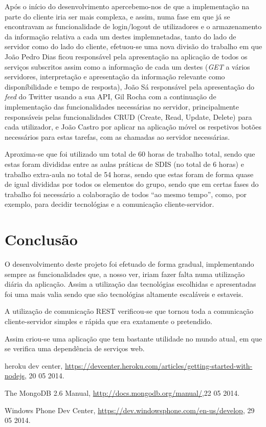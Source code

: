 \documentclass[12pt]{article}
\begin{document}
Após o início do desenvolvimento apercebemo-nos de que a implementação na parte do cliente iria ser mais complexa, e assim, numa fase em que já se encontravam as funcionalidade de login/logout de utilizadores e o armazenamento da informação relativa a cada um destes implemnetadas, tanto do lado de servidor como do lado do cliente, efetuou-se uma nova divisão do trabalho em que João Pedro Dias ficou responsável pela apresentação na aplicação de todos os serviços subscritos assim como a informação de cada um destes (\textit{GET} a vários servidores, interpretação e apresentação da informação relevante como disponíbilidade e tempo de resposta), João Sá responsável pela apresentação do \textit{feed} do Twitter usando a sua API, Gil Rocha com a continuação de implementação das funcionalidades necessárias no servidor, principalmente responsáveis pelas funcionalidades CRUD (Create, Read, Update, Delete) para cada utilizador, e João Castro por aplicar na aplicação móvel os respetivos botões necessários para estas tarefas, com as chamadas ao servidor necessárias.

Aproxima-se que foi utilizado um total de 60 horas de trabalho total, sendo que estas foram divididas entre as aulas práticas de SDIS (no total de 6 horas) e trabalho extra-aula no total de 54 horas, sendo que estas foram de forma quase de igual divididas por todos os elementos do grupo, sendo que em certas fases do trabalho foi necessário a colaboração de todos ``ao mesmo tempo'', como, por exemplo, para decidir tecnológias e a comunicação cliente-servidor. 

\section{Conclusão}

O desenvolvimento deste projeto foi efetuado de forma gradual, implementando sempre as funcionalidades que, a nosso ver, iriam fazer falta numa utilização diária da aplicação. Assim a utilização das tecnológias escolhidas e apresentadas foi uma mais valia sendo que são tecnológias altamente escaláveis e estaveis.

A utilização de comunicação REST verificou-se que tornou toda a comunicação cliente-servidor simples e rápida que era exatamente o pretendido.

Assim criou-se uma aplicação que tem bastante utilidade no mundo atual, em que se verifica uma dependência de serviços web.
\begin{thebibliography}{1}

heroku dev center, \url{https://devcenter.heroku.com/articles/getting-started-with-nodejs}, 20 05 2014.

The MongoDB 2.6 Manual, \url{http://docs.mongodb.org/manual/},22 05 2014.

Windows Phone Dev Center, \url{https://dev.windowsphone.com/en-us/develop}, 29 05 2014.

\end{thebibliography}
\end{document}
